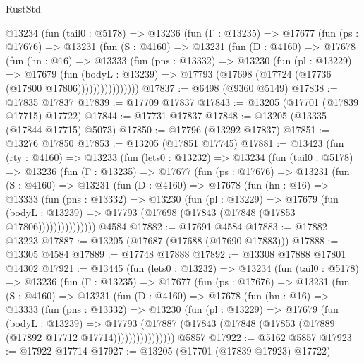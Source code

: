 \begin{lexlean}{RustStd}
\begin{coremodule}
        @13234
          (fun (tail0 : @5178) =>
          @13236
            (fun (Γ : @13235) =>
            @17677
              (fun (ps : @17676) =>
              @13231
                (fun (S : @4160) =>
                @13231
                  (fun (D : @4160) =>
                  @17678
                    (fun (hn : @16) =>
                    @13333
                      (fun (pns : @13332) =>
                      @13230
                        (fun (pl : @13229) =>
                        @17679
                          (fun (bodyL : @13239) =>
                          @17793 (@17698 (@17724 (@17736 (@17800 @17806))))))))))))))))
@17837 := @6498 (@9360 @5149)
@17838 := @17835 @17837
@17839 := @17709 @17837
@17843 := @13205 (@17701 (@17839 @17715) @17722)
@17844 := @17731 @17837
@17848 := @13205 (@13335 (@17844 @17715) @5073)
@17850 := @17796 (@13292 @17837)
@17851 := @13276 @17850
@17853 := @13205 (@17851 @17745)
@17881 := @13423
    (fun (rty : @4160) =>
    @13233
      (fun (lets0 : @13232) =>
      @13234
        (fun (tail0 : @5178) =>
        @13236
          (fun (Γ : @13235) =>
          @17677
            (fun (ps : @17676) =>
            @13231
              (fun (S : @4160) =>
              @13231
                (fun (D : @4160) =>
                @17678
                  (fun (hn : @16) =>
                  @13333
                    (fun (pns : @13332) =>
                    @13230
                      (fun (pl : @13229) =>
                      @17679
                        (fun (bodyL : @13239) =>
                        @17793 (@17698 (@17843 (@17848 (@17853 @17806)))))))))))))))
    @4584
@17882 := @17691 @4584
@17883 := @17882 @13223
@17887 := @13205 (@17687 (@17688 (@17690 @17883)))
@17888 := @13305 @4584
@17889 := @17748 @17888
@17892 := @13308 @17888 @17801 @14302
@17921 := @13445
    (fun (lets0 : @13232) =>
    @13234
      (fun (tail0 : @5178) =>
      @13236
        (fun (Γ : @13235) =>
        @17677
          (fun (ps : @17676) =>
          @13231
            (fun (S : @4160) =>
            @13231
              (fun (D : @4160) =>
              @17678
                (fun (hn : @16) =>
                @13333
                  (fun (pns : @13332) =>
                  @13230
                    (fun (pl : @13229) =>
                    @17679
                      (fun (bodyL : @13239) =>
                      @17793
                        (@17887
                          (@17843 (@17848 (@17853 (@17889 (@17892 @17712 @17714))))))))))))))))
    @5857
@17922 := @5162 @5857
@17923 := @17922 @17714
@17927 := @13205 (@17701 (@17839 @17923) @17722)

\end{coremodule}
\end{lexlean}
